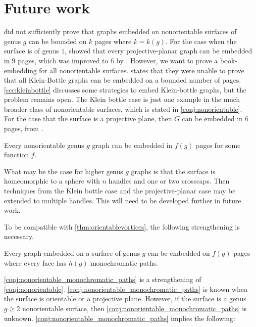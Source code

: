 
\section{Future work}

\textcite{heathEmbeddingPlanarGraphs1984} did not sufficiently prove that graphs embedded on nonorientable surfaces of genus $g$ can be bounded on $k$ pages where $k = k(g)$. For the case when the surface is of genus $1$, \textcite{nakamotoBookEmbeddingProjectiveplanar2015} showed that every projective-planar graph can be embedded in $9$ pages, which was improved to 6 by \textcite{ozekiBookEmbeddingGraphs2019}. However, we want to prove a book-embedding for all nonorientable surfaces. 
\textcite{ozekiBookEmbeddingGraphs2019} states that they were unable to prove that all Klein-Bottle graphs can be embedded on a bounded number of pages. \cref{sec:kleinbottle} discusses some strategies to embed Klein-bottle graphs, but the problem remains open. The Klein bottle case is just one example in the much broader class of nonorientable surfaces, which is stated in \cref{conj:nonorientable}. For the case that the surface is a projective plane, then $G$ can be embedded in 6 pages, from \textcite{ozekiBookEmbeddingGraphs2019}. 
\begin{conjecture}\label{conj:nonorientable}
	Every nonorientable genus $g$ graph can be embedded in $f(g)$ pages for some function $f$. 
\end{conjecture}

What may be the case for higher genus $g$ graphs is that the surface is homeomorphic to a sphere with $n$ handles and one or two crosscaps. Then techniques from the Klein bottle case and the projective-planar case may be extended to multiple handles. This will need to be developed further in future work.

To be compatible with \cref{thm:orientablevortices}, the following strengthening is necessary. 
\begin{conjecture}\label{conj:nonorientable_monochromatic_paths}
	Every graph embedded on a surface of genus $g$ can be embedded on $f(g)$ pages where every face has $h(g)$ monochromatic paths. 
\end{conjecture}

\cref{conj:nonorientable_monochromatic_paths} is a strengthening of \cref{conj:nonorientable}. \cref{conj:nonorientable_monochromatic_paths} is known when the surface is orientable or a projective plane. However, if the surface is a genus $g \geq 2$ nonorientable surface, then \cref{conj:nonorientable_monochromatic_paths} is unknown. 
\cref{conj:nonorientable_monochromatic_paths} implies the following:

